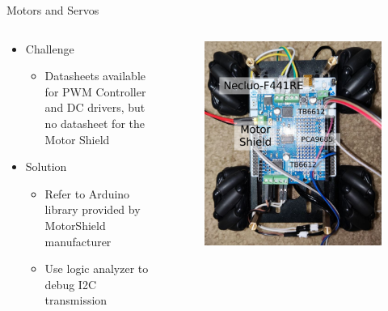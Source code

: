 \documentclass[12pt]{beamer}
\begin{document}
\begin{frame}{Motors and Servos}
    \begin{columns}
        \begin{column}{.65\linewidth}
            \begin{itemize}
                \item Challenge
                      \begin{itemize}
                          \item Datasheets available for PWM Controller and DC drivers, but\\
                                no datasheet for the Motor Shield
                      \end{itemize}
                \item Solution
                      \begin{itemize}
                          \item Refer to Arduino library provided by MotorShield manufacturer
                          \item Use logic analyzer to debug I2C transmission
                      \end{itemize}

            \end{itemize}
        \end{column}
        \begin{column}{.3\linewidth}
            \begin{figure}[H]
                \centering
                \includegraphics[width=\textwidth]{motorshield.png}
            \end{figure}
        \end{column}
    \end{columns}
\end{frame}
\end{document}
